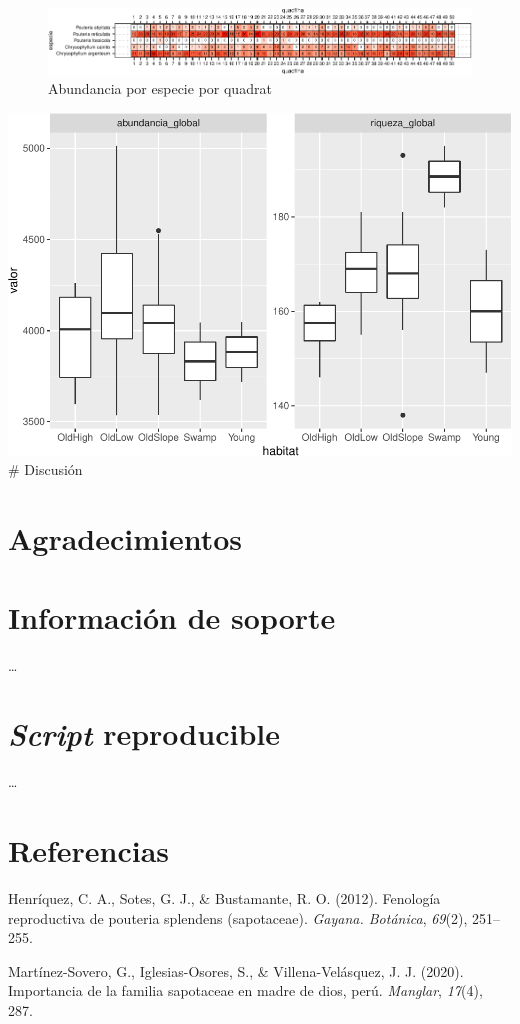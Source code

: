 \documentclass[11pt,]{article}
\begin{document}
\begin{figure}
\centering
\includegraphics{manuscrito_files/figure-latex/unnamed-chunk-3-1.pdf}
\caption{\label{fig:abun_sp_q}Abundancia por especie por quadrat}
\end{figure}

\includegraphics{manuscrito_files/figure-latex/unnamed-chunk-4-1.pdf} \#
Discusión

\section{Agradecimientos}\label{agradecimientos}

\section{Información de soporte}\label{informaciuxf3n-de-soporte}

\ldots

\section{\texorpdfstring{\emph{Script}
reproducible}{Script reproducible}}\label{script-reproducible}

\ldots

\section*{Referencias}\label{referencias}

\hypertarget{refs}{}
\hypertarget{ref-henriquez2012fenologia}{}
Henríquez, C. A., Sotes, G. J., \& Bustamante, R. O. (2012). Fenología
reproductiva de pouteria splendens (sapotaceae). \emph{Gayana.
Botánica}, \emph{69}(2), 251--255.

\hypertarget{ref-martinez2020importancia}{}
Martínez-Sovero, G., Iglesias-Osores, S., \& Villena-Velásquez, J. J.
(2020). Importancia de la familia sapotaceae en madre de dios, perú.
\emph{Manglar}, \emph{17}(4), 287.




\newpage
\singlespacing 
\end{document}
